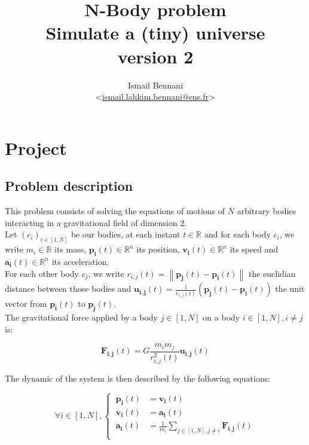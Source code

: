 \documentclass{article}
\title{\textbf{N-Body problem} \\
       \Large Simulate a (tiny) universe\\
       \small version 2}
\author{Ismail Bennani \\
        <\href{mailto:ismail.lahkim.bennani@ens.fr}{ismail.lahkim.bennani@ens.fr}>}
\date{}
\newcommand{\norm}[1]{\left\lVert#1\right\rVert}
\newcommand{\myvec}[1]{\ensuremath{\mathbf{#1}}}
\begin{document}
\maketitle

\section{Project}
\label{projet}

\subsection{Problem description}
\label{description}

This problem consists of solving the equations of motions of $N$ arbitrary bodies interacting in a gravitational field of dimension 2. \\
Let $(c_i)_{i\in[1,N]}$ be our bodies, at each instant $t \in \mathbb{R}$ and for each body $c_i$, we write $m_i \in \mathbb{R}$ its mass, $\myvec{p_i}(t) \in \mathbb{R}^n$ its position, $\myvec{v_i}(t) \in \mathbb{R}^n$ its speed and $\myvec{a_i}(t) \in \mathbb{R}^n$ its acceleration.\\
For each other body $c_j$, we write $r_{i,j}(t) = \norm{\myvec{p_j}(t) - \myvec{p_i}(t)}$ the euclidian distance between those bodies and $\myvec{u_{i,j}}(t) = \frac{1}{r_{i,j}(t)}(\myvec{p_j}(t)-\myvec{p_i}(t))$ the unit vector from $\myvec{p_i}(t)$ to $\myvec{p_j}(t)$.\\

The gravitational force applied by a body $j \in [1,N]$ on a body $i \in [1,N], i \ne j$ is:

\begin{equation*}
    \myvec{F_{i,j}}(t) = G \frac{m_im_j}{r^2_{i,j}(t)} \myvec{u_{i,j}}(t)
\end{equation*}

The dynamic of the system is then described by the following equations:

\begin{equation*}
\forall i \in [1,N], \left\{\begin{aligned}
    \ \myvec{\dot{p_i}}(t) & = \myvec{v_i}(t) \\
    \ \myvec{\dot{v_i}}(t) & = \myvec{a_i}(t) \\
    \ \myvec{a_i}(t) & = \frac{1}{m_i} \sum_{j \in [1,N], j \ne i} \myvec{F_{i,j}}(t) \\
\end{aligned}\right.
\end{equation*}
\end{document}
